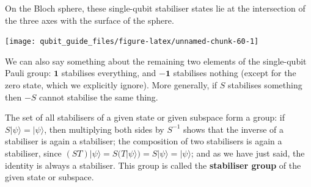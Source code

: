 \documentclass[fleqn,a4paper]{article}
\theoremstyle{definition}
\theoremstyle{definition}
\theoremstyle{definition}
\theoremstyle{definition}
\theoremstyle{remark}
\begin{document}
On the Bloch sphere, these single-qubit stabiliser states lie at the intersection of the three axes with the surface of the sphere.

\begin{center}\texttt{[image: qubit\_guide\_files/figure-latex/unnamed-chunk-60-1]} \end{center}

We can also say something about the remaining two elements of the single-qubit Pauli group: \(\mathbf{1}\) stabilises everything, and \(-\mathbf{1}\) stabilises nothing (except for the zero state, which we explicitly ignore).
More generally, if \(S\) stabilises something then \(-S\) cannot stabilise the same thing.

The set of all stabilisers of a given state or given subspace form a group: if \(S|\psi\rangle=|\psi\rangle\), then multiplying both sides by \(S^{-1}\) shows that the inverse of a stabiliser is again a stabiliser; the composition of two stabilisers is again a stabiliser, since \((ST)|\psi\rangle=S(T|\psi\rangle)=S|\psi\rangle=|\psi\rangle\); and as we have just said, the identity is always a stabiliser.
This group is called the \textbf{stabiliser group} of the given state or subspace.
\end{document}
